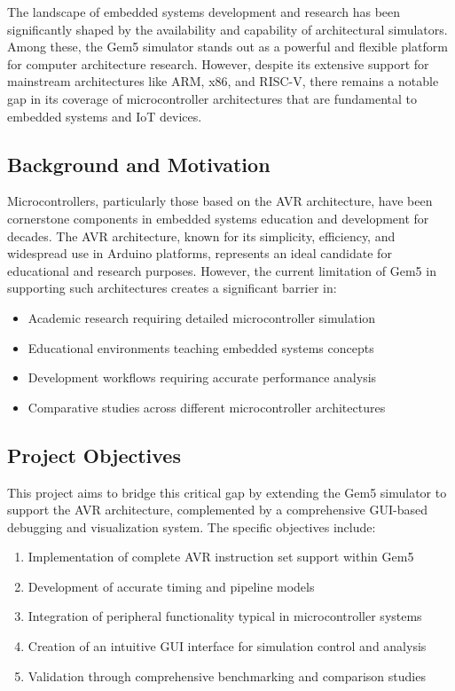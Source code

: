 The landscape of embedded systems development and research has been significantly shaped by the availability and capability of architectural simulators. Among these, the Gem5 simulator stands out as a powerful and flexible platform for computer architecture research. However, despite its extensive support for mainstream architectures like ARM, x86, and RISC-V, there remains a notable gap in its coverage of microcontroller architectures that are fundamental to embedded systems and IoT devices.

\subsection{Background and Motivation}

Microcontrollers, particularly those based on the AVR architecture, have been cornerstone components in embedded systems education and development for decades. The AVR architecture, known for its simplicity, efficiency, and widespread use in Arduino platforms, represents an ideal candidate for educational and research purposes. However, the current limitation of Gem5 in supporting such architectures creates a significant barrier in:
\begin{itemize}
    \item Academic research requiring detailed microcontroller simulation
    \item Educational environments teaching embedded systems concepts
    \item Development workflows requiring accurate performance analysis
    \item Comparative studies across different microcontroller architectures
\end{itemize}

\subsection{Project Objectives}
This project aims to bridge this critical gap by extending the Gem5 simulator to support the AVR architecture, complemented by a comprehensive GUI-based debugging and visualization system. The specific objectives include:
\begin{enumerate}
    \item Implementation of complete AVR instruction set support within Gem5
    \item Development of accurate timing and pipeline models
    \item Integration of peripheral functionality typical in microcontroller systems
    \item Creation of an intuitive GUI interface for simulation control and analysis
    \item Validation through comprehensive benchmarking and comparison studies
\end{enumerate}

